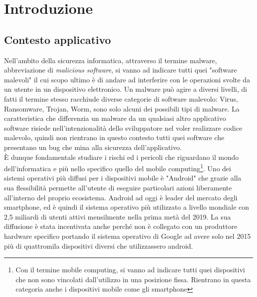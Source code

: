 \mainmatter %
\chapter{Introduzione}
\label{chap:Introduzione}


\section{Contesto applicativo}
\label{sec:intro1}
Nell'ambito della sicurezza informatica, attraverso il termine malware, abbreviazione di \textit{malicious software}, si vanno ad indicare tutti quei "software malevoli" il cui scopo ultimo è di andare ad interferire con le operazioni svolte da un utente in un dispositivo elettronico. Un malware può agire a diversi livelli, di fatti il termine stesso racchiude diverse categorie di software malevolo: Virus, Ransomware, Trojan, Worm, sono solo alcuni dei possibili tipi di malware. La caratteristica che differenzia un malware da un qualsiasi altro applicativo software risiede nell'intenzionalità dello sviluppatore nel voler realizzare codice malevolo, quindi non rientrano in questo contesto tutti quei software che presentano un bug che mina alla sicurezza dell'applicativo. 
\\È dunque fondamentale studiare i rischi ed i pericoli che riguardano il mondo dell'informatica e più nello specifico quello del mobile computing\footnote{Con il termine mobile computing, si vanno ad indicare tutti quei dispositivi che non sono vincolati dall'utilizzo in una posizione fissa. Rientrano in questa categoria anche i dispositivi mobile come gli smartphone}. Uno dei sistemi operativi più diffusi per i dispositivi mobile è "Android" che grazie alla sua flessibilità permette all'utente di eseguire particolari azioni liberamente all'interno del proprio ecosistema. Android  ad oggi è leader del mercato degli smartphone, ed è quindi il sistema operativo più utilizzato a livello mondiale con 2,5 miliardi di utenti attivi mensilmente nella prima metà del 2019\cite{venturebeat}. La sua diffusione è stata incentivata anche perché non è collegato con un produttore hardware specifico portando il sistema operativo di Google ad avere solo nel 2015 più di quattromila dispositivi diversi che utilizzassero android\cite{4000}. 






